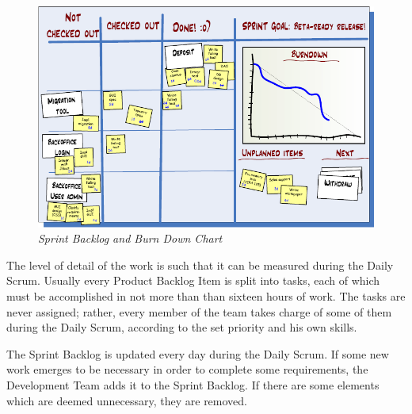 			\begin{figure}[h]
			  \begin{center} 
			    \includegraphics[scale=0.65]{images/ch_04/task_board_and_chart.png}
			  \end{center} 
			  \caption{\textit{Sprint Backlog and Burn Down Chart}}  
			  \label{fig:SprintBacklog}
		  	\end{figure}

			The level of detail of the work is such that it can be measured during the Daily Scrum.
			Usually every Product Backlog Item is split into tasks, each of which must be accomplished in not more than than sixteen hours of work. The tasks are never assigned; rather, every member of the team takes charge of some of them during the Daily Scrum, according to the set priority and his own skills.
			
			The Sprint Backlog is updated every day during the Daily Scrum. If some new work emerges to be necessary in order to complete some requirements, the Development Team adds it to the Sprint Backlog. If there are some elements which are deemed unnecessary, they are removed. 


